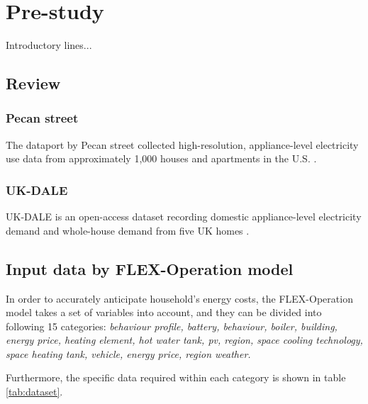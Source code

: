 \chapter{Pre-study} 

Introductory lines...

\section{Review}

\subsection{Pecan street}

The dataport by Pecan street collected high-resolution, appliance-level electricity use data from approximately 1,000 houses and apartments in the U.S. \cite{pecanstreet}. 

\subsection{UK-DALE}

UK-DALE is an open-access dataset recording domestic appliance-level electricity demand and whole-house demand from five UK homes \cite{ukdale}.

\section{Input data by FLEX-Operation model}

In order to accurately anticipate household's energy costs,
the FLEX-Operation model takes a set of variables into account,
and they can be divided into following 15 categories: 
\emph{
    behaviour profile,
    battery,
    behaviour, 
    boiler,
    building,
    energy price,
    heating element, 
    hot water tank,
    \gls{pv},
    region,
    space cooling technology,
    space heating tank,
    vehicle,
    energy price,
    region weather. 
}

Furthermore, the specific data required within each category is shown in table \ref{tab:dataset}. 

